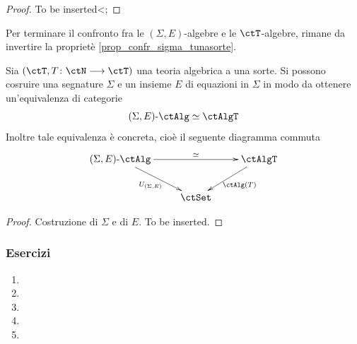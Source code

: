 \begin{proof}
 To be inserted<;
\end{proof}

Per terminare il confronto fra le \((\Sigma,E)\)-algebre e le \(\ctT\)-algebre, rimane da invertire la proprietè \ref{prop_confr_sigma_tunasorte}.

\begin{proposition}\label{prop_confr_sigma_tunasorte_bis}
 Sia \((\ctT, T \colon \ctN \fun \ctT)\) una teoria algebrica a una sorte. Si possono cosruire una segnature \(\Sigma\) e un insieme \(E\) di equazioni
 in \(\Sigma\) in modo da ottenere un'equivalenza di categorie
 \[\ctSEAlg \simeq \ctAlgT\]
 Inoltre tale equivalenza è concreta, cioè il seguente diagramma commuta
 \[\xymatrix{\ctSEAlg \ar[rr]^-{\simeq} \ar[rd]_{U_{(\Sigma,E)}} & & \ctAlgT \ar[ld]^{\ctAlg(T)} \\
  & \ctSet }\]
\end{proposition}

\begin{proof}
 Costruzione di \(\Sigma\) e di \(E\). To be inserted.
\end{proof}


\subsubsection*{Esercizi}
\begin{enumerate}
 \item
 \item
 \item
 \item
 \item
\end{enumerate}

